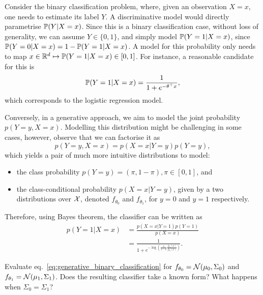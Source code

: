 \begin{example}
	Consider the binary classification problem, where, given an observation $X=x$, one needs to estimate its label $Y$. A discriminative model would directly parametrise $\P(Y|X=x)$. Since this is a binary classification case, without loss of generality, we can assume $Y\in\{0,1\}$, and simply model $\P(Y=1|X=x)$, since $\P(Y=0|X=x) = 1 - \P(Y=1|X=x)$.  A model for this probability only needs to map $x\in\R^d \mapsto \P(Y=1|X=x)\in[0,1]$. For instance, a reasonable candidate for this is
	\begin{equation}
		\P(Y=1|X=x) = \frac{1}{1+e^{-\theta^\top x}},
	\end{equation}
	which corresponds to the logistic regression model.

	Conversely, in a generative approach, we aim to model the joint probability $p(Y=y, X=x)$. Modelling this distribution might be challenging in some cases, however, observe that we can factorise it as 
	\begin{equation}
		p(Y=y, X=x) = p(X=x|Y=y)p(Y=y),
	\end{equation}
	which yields a pair of much more intuitive distributions to model: 
	\begin{itemize}
		\item the class probability $p(Y=y) = (\pi,1-\pi), \pi\in[0,1]$, and 
		\item the class-conditional probability $p(X=x|Y=y)$, given by a two distributions over $\cX$, denoted $f_{\theta_0}$ and $f_{\theta_1}$, for $y=0$ and $y=1$ respectively.
	\end{itemize}
	Therefore, using Bayes theorem, the classifier can be written as 
	\begin{align}
		p(Y=1 | X=x) 	&= \frac{p(X=x|Y=1)p(Y=1)}{p(X=x)}\nonumber \\
						&= \frac{1}{1 + e^{-\log\left(\frac{\pi}{1-\pi}\frac{f_{\theta_1}(x)}{f_{\theta_0}(x)}\right)}}.\label{eq:generative_binary_classification}
	\end{align}
\end{example}

\begin{exercise}
Evaluate eq.~\eqref{eq:generative_binary_classification} for $f_{\theta_0} = \cN(\mu_0,\Sigma_0)$ and $f_{\theta_1} = \cN(\mu_1,\Sigma_1)$. Does the resulting classifier take a known form? What happens when $\Sigma_0=\Sigma_1$?
\end{exercise}

